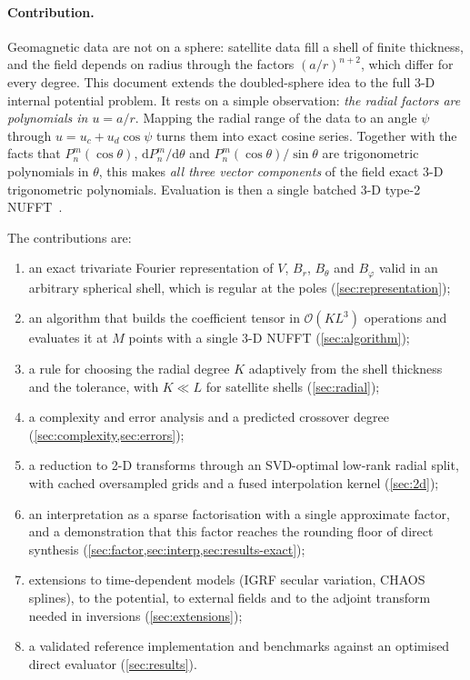 \documentclass[11pt,a4paper]{article}
\theoremstyle{remark}
\newcommand{\Oh}{\mathcal{O}}
\begin{document}
\paragraph{Contribution.}
Geomagnetic data are not on a sphere: satellite data fill a shell of finite thickness, and
the field depends on radius through the factors $(a/r)^{n+2}$, which differ for every degree.
This document extends the doubled-sphere idea to the full 3-D internal potential problem. It
rests on a simple observation: \emph{the radial factors are polynomials in $u=a/r$}. Mapping
the radial range of the data to an angle $\psi$ through $u=u_c+u_d\cos\psi$ turns them into
exact cosine series. Together with the facts that $P_n^m(\cos\theta)$, $\mathrm dP_n^m/\mathrm
d\theta$ and $P_n^m(\cos\theta)/\sin\theta$ are trigonometric polynomials in $\theta$, this
makes \emph{all three vector components} of the field exact 3-D trigonometric polynomials.
Evaluation is then a single batched 3-D type-2 NUFFT~\cite{dutt1993,greengard2004,barnett2019}.

The contributions are:
\begin{enumerate}
\item an exact trivariate Fourier representation of $V$, $B_r$, $B_\theta$ and $B_\varphi$ valid
  in an arbitrary spherical shell, which is regular at the poles (\cref{sec:representation});
\item an algorithm that builds the coefficient tensor in $\Oh(KL^3)$ operations and evaluates it at
  $M$ points with a single 3-D NUFFT (\cref{sec:algorithm});
\item a rule for choosing the radial degree $K$ adaptively from the shell thickness and the
  tolerance, with $K\ll L$ for satellite shells (\cref{sec:radial});
\item a complexity and error analysis and a predicted crossover degree (\cref{sec:complexity,sec:errors});
\item a reduction to 2-D transforms through an SVD-optimal low-rank radial split, with cached
  oversampled grids and a fused interpolation kernel (\cref{sec:2d});
\item an interpretation as a sparse factorisation with a single approximate factor, and a demonstration that this
  factor reaches the rounding floor of direct synthesis (\cref{sec:factor,sec:interp,sec:results-exact});
\item extensions to time-dependent models (IGRF secular variation, CHAOS splines), to the
  potential, to external fields and to the adjoint transform needed in inversions (\cref{sec:extensions});
\item a validated reference implementation and benchmarks against an optimised direct
  evaluator (\cref{sec:results}).
\end{enumerate}
\end{document}
